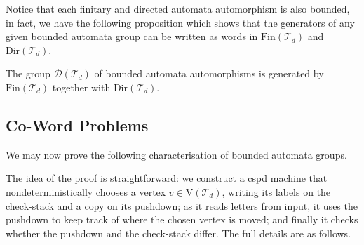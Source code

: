 Notice that each finitary and directed automata automorphism is also bounded, in fact, we have the following proposition which shows that the generators of any given bounded automata group can be written as words in $\mathrm{Fin}\!\left(\mathcal{T}_d\right)$ and $\mathrm{Dir}\!\left(\mathcal{T}_d\right)$.

\begin{proposition}
	\label{prop:bounded automata group if directed}
	The group $\mathcal{D}\!\left(\mathcal{T}_d\right)$ of bounded automata automorphisms is generated by $\mathrm{Fin}\!\left(\mathcal{T}_d\right)$ together with $\mathrm{Dir}\!\left(\mathcal{T}_d\right)$.
\end{proposition}

\subsection{Co-Word Problems}\label{sec:mainthm}

We may now prove the following characterisation of bounded automata groups.

\setcounter{theoremx}{3}
\TheoremBoundedAutomata

The idea of the proof is straightforward:
we construct a cspd machine that nondeterministically chooses a vertex $v \in \mathrm{V}(\mathcal{T}_d)$, writing its labels on the check-stack and a copy on its pushdown;
as it reads letters from input, it uses the pushdown to keep track of where the chosen vertex is moved;
and finally it checks whether the pushdown and the check-stack differ.
The full details are as follows.


